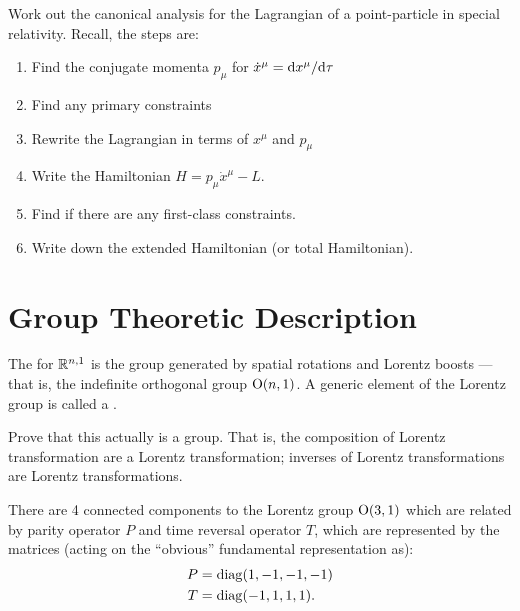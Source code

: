 \begin{exercise}\label{xca:relativity:canonical-analysis-of-free-particle}
Work out the canonical analysis for the Lagrangian of a point-particle
in special relativity. Recall, the steps are:
\begin{enumerate}
\item Find the conjugate momenta $p_{\mu}$ for $\dot{x}^{\mu}=\mathrm{d} x^{\mu}/\mathrm{d}\tau$
\item Find any primary constraints
\item Rewrite the Lagrangian in terms of $x^{\mu}$ and $p_{\mu}$
\item Write the Hamiltonian $H = p_{\mu}\dot{x}^{\mu}-L$.
\item Find if there are any first-class constraints.
\item Write down the extended Hamiltonian (or total Hamiltonian).
\end{enumerate}
\end{exercise}

\section{Group Theoretic Description}

\begin{definition}
The  for $\mathbb{R}^{n,1}$ is the group
generated by spatial rotations and Lorentz boosts --- that is, the indefinite
orthogonal group $\mathrm{O}(n,1)$. A generic element of the Lorentz group is
called a .
\end{definition}

\begin{exercise}
Prove that this actually is a group. That is, the composition of Lorentz
transformation are a Lorentz transformation; inverses of Lorentz
transformations are Lorentz transformations.
\end{exercise}

\M
There are 4 connected components to the Lorentz group $\mathrm{O}(3,1)$ which
are related by parity operator $P$ and time reversal operator $T$, which
are represented by the matrices (acting on the ``obvious'' fundamental
representation as):
\begin{subequations}
\begin{align}
P &= \operatorname{diag}(1, -1, -1, -1)\\
T &= \operatorname{diag}(-1, 1, 1, 1).
\end{align}
\end{subequations}

